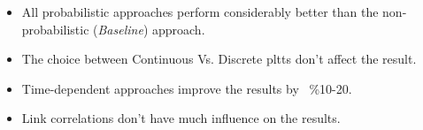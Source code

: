\documentclass[t]{beamer}
\begin{document}
\begin{frame}
{}
\begin{itemize}
\item<2-> All probabilistic approaches perform considerably better than the non-probabilistic (\textit{Baseline}) approach.
\item<3-> The choice between Continuous Vs. Discrete pltts don't affect the result.
\item<4-> Time-dependent approaches improve the results by ~\%10-20.
\item<5-> Link correlations don't have much influence on the results.
\end{itemize}
\end{frame}
\end{document}
